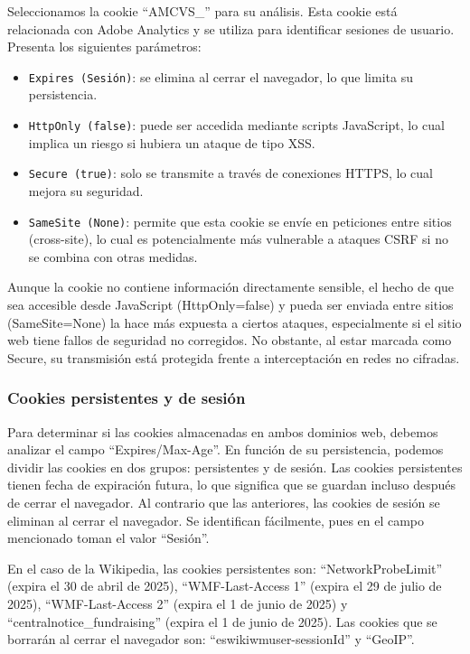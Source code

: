Seleccionamos la cookie ``AMCVS\_'' para su análisis. Esta cookie está relacionada con Adobe Analytics y se utiliza para identificar sesiones de usuario. Presenta los siguientes parámetros: 

\begin{itemize}
    \item \texttt{Expires (Sesión)}: se elimina al cerrar el navegador, lo que limita su persistencia.
    \item \texttt{HttpOnly (false)}: puede ser accedida mediante scripts JavaScript, lo cual implica un riesgo si hubiera un ataque de tipo XSS.  
    \item \texttt{Secure (true)}: solo se transmite a través de conexiones HTTPS, lo cual mejora su seguridad.
    \item \texttt{SameSite (None)}: permite que esta cookie se envíe en peticiones entre sitios (cross-site), lo cual es potencialmente más vulnerable a ataques CSRF si no se combina con otras medidas.
\end{itemize}

Aunque la cookie no contiene información directamente sensible, el hecho de que sea accesible desde JavaScript (HttpOnly=false) y pueda ser enviada entre sitios (SameSite=None) la hace más expuesta a ciertos ataques, especialmente si el sitio web tiene fallos de seguridad no corregidos. No obstante, al estar marcada como Secure, su transmisión está protegida frente a interceptación en redes no cifradas. 

\subsubsection{Cookies persistentes y de sesión}

Para determinar si las cookies almacenadas en ambos dominios web, debemos analizar el campo ``Expires/Max-Age''. En función de su persistencia, podemos dividir las cookies en dos grupos: persistentes y de sesión. Las cookies persistentes tienen fecha de expiración futura, lo que significa que se guardan incluso después de cerrar el navegador. Al contrario que las anteriores, las cookies de sesión se eliminan al cerrar el navegador. Se identifican fácilmente, pues en el campo mencionado toman el valor ``Sesión''. 

En el caso de la Wikipedia, las cookies persistentes son: ``NetworkProbeLimit'' (expira el 30 de abril de 2025), ``WMF-Last-Access 1'' (expira el 29 de julio de 2025), ``WMF-Last-Access 2'' (expira el 1 de junio de 2025) y ``centralnotice\_fundraising'' (expira el 1 de junio de 2025). Las cookies que se borrarán al cerrar el navegador son: ``eswikiwmuser-sessionId'' y ``GeoIP''.

